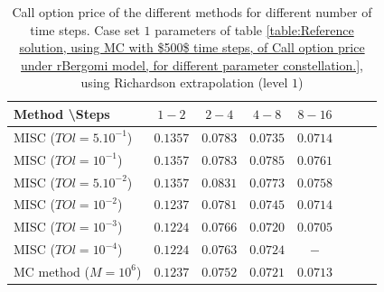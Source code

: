 \documentclass[11pt]{article}
\begin{document}
\begin{table}[h!]
	\centering
	\begin{tabular}{l*{6}{c}r}
		Method \textbackslash  Steps    &$1-2$         & $2-4$ & $4-8$ & $8-16$\\
		\hline
		MISC ($TOl=5.10^{-1}$)& $0.1357$  & $0.0783$ & $0.0735$ & $0.0714$ \\
		MISC ($TOl=10^{-1}$)  &$0.1357$  &$0.0783$ & $0.0785$ & $0.0761$  \\
		MISC ($TOl=5.10^{-2}$)  & $0.1357$ & $0.0831$ & $0.0773$ & $0.0758$   \\
		MISC ($TOl=10^{-2}$)  & $0.1237$ &$0.0781$ & $0.0745$ & $0.0714$  \\
		MISC ($TOl=10^{-3}$)  & $0.1224$ &$0.0766$ & $0.0720$ & $0.0705$ \\
		MISC ($TOl=10^{-4}$)  &$0.1224$ & $0.0763$ & $0.0724$ & $-$ \\
		\hline
		MC method ($M=10^6$)  &$	0.1237$ & $0.0752$ & $0.0721$ & $  0.0713$ \\
		\hline
	\end{tabular}
	\caption{Call option price of the different methods for different number of time steps. Case set $1$ parameters of table \ref{table:Reference solution, using MC with $500$ time steps, of Call option price under rBergomi model, for different parameter constellation.}, using Richardson extrapolation (level $1$)}
	\label{table:  Call option price of the different methods for different number of time steps. Case set $1$ parameter, using Richardson extrapolation (level $1$)}
\end{table}
\end{document}
